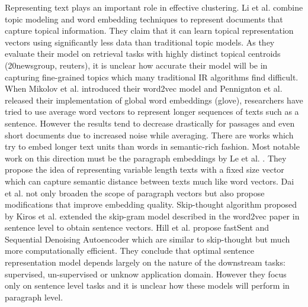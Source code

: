 \documentclass[sigconf,authordraft]{acmart}
\begin{document}
Representing text plays an important role in effective clustering. Li et al. \cite{li2016generative} combine topic modeling and word embedding techniques to represent documents that capture topical information. They claim that it can learn topical representation vectors using significantly less data than traditional topic models. As they evaluate their model on retrieval tasks with highly distinct topical centroids (20newsgroup, reuters), it is unclear how accurate their model will be in capturing fine-grained topics which many traditional IR algorithms find difficult. When Mikolov et al. \cite{mikolov2013distributed} introduced their word2vec model and Pennignton et al. \cite{pennington2014glove} released their implementation of global word embeddings (glove), researchers have tried to use average word vectors to represent longer sequences of texts such as a sentence. However the results tend to decrease drastically for passages and even short documents due to increased noise while averaging. There are works which try to embed longer text units than words in semantic-rich fashion. Most notable work on this direction must be the paragraph embeddings by Le et al. \cite{le2014distributed}. They propose the idea of representing variable length texts with a fixed size vector which can capture semantic distance between texts much like word vectors. Dai et al. \cite{dai2015document} not only broaden the scope of paragraph vectors but also propose modifications that improve embedding quality. Skip-thought algorithm proposed by Kiros et al. \cite{kiros2015skip} extended the skip-gram model described in the word2vec paper in sentence level to obtain sentence vectors. Hill et al. \cite{hill2016learning} propose fastSent and Sequential Denoising Autoencoder which are similar to skip-thought but much more computationally efficient. They conclude that optimal sentence representation model depends largely on the nature of the downstream tasks: supervised, un-supervised or unknow application domain. However they focus only on sentence level tasks and it is unclear how these models will perform in paragraph level.


\end{document}

